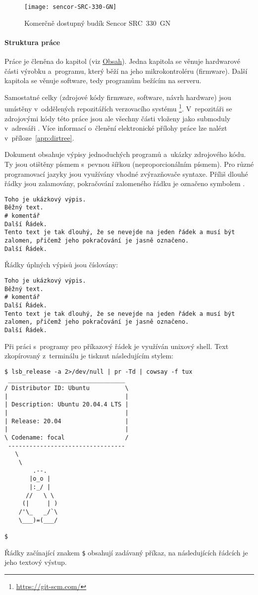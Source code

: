 \begin{figure}[htbp]
    \centering
    \texttt{[image: sencor-SRC-330-GN]}
    \caption{Komerčně dostupný budík Sencor SRC~330~GN}
    \label{fig:sencor}
\end{figure}


\paragraph{Struktura práce}
Práce je členěna do kapitol (viz \hyperref[toc]{Obsah}). Jedna kapitola se
věnuje hardwarové části výrobku a~programu, který běží na jeho mikrokontroléru
(firmware).
Další kapitola se věnuje software, tedy programům bežícím na serveru.

Samostatné celky (zdrojové kódy firmware, software, návrh hardware) jsou
umístěny v~oddělených repozitářích verzovacího systému
\footnote{\url{https://git-scm.com/}}. V~repozitáři se zdrojovými
kódy této práce jsou ale všechny části vloženy jako submoduly v~adresáři
. Více informací o~členění elektronické přílohy práce lze
nalézt v~příloze~\vref{app:dirtree}.

Dokument obsahuje výpisy jednoduchých programů a~ukázky zdrojového kódu.
Ty jsou otištěny písmem s~pevnou šířkou (neproporcionálním písmem). Pro různé
programovací jazyky jsou využívány vhodné zvýrazňovače syntaxe. Příliš dlouhé
řádky jsou zalamovány, pokračování zalomeného řádku je označeno symbolem
\lstpostbreak{}.

\begin{lstlisting}[language=hashcomment]
Toho je ukázkový výpis.
Běžný text.
# komentář
Další Řádek.
Tento text je tak dlouhý, že se nevejde na jeden řádek a musí být zalomen, přičemž jeho pokračování je jasně označeno.
Další Řádek.
\end{lstlisting}

Řádky úplných výpisů jsou číslovány:
\begin{lstlisting}[language=hashcomment,style=numbers]
Toho je ukázkový výpis.
Běžný text.
# komentář
Další Řádek.
Tento text je tak dlouhý, že se nevejde na jeden řádek a musí být zalomen, přičemž jeho pokračování je jasně označeno.
Další Řádek.
\end{lstlisting}

Při práci s~programy pro příkazový řádek je využíván unixový shell.
Text zkopírovaný z~terminálu je tisknut následujícím stylem:
\begin{lstlisting}[style=terminal]
$ lsb_release -a 2>/dev/null | pr -Td | cowsay -f tux
 _________________________________
/ Distributor ID: Ubuntu          \
|                                 |
| Description: Ubuntu 20.04.4 LTS |
|                                 |
| Release: 20.04                  |
|                                 |
\ Codename: focal                 /
 ---------------------------------
   \
    \
        .--.
       |o_o |
       |:_/ |
      //   \ \
     (|     | )
    /'\_   _/`\
    \___)=(___/

$
\end{lstlisting}
Řádky začínající znakem \texttt{\$} obsahují zadávaný příkaz, na následujících
řádcích je jeho textový výstup.
